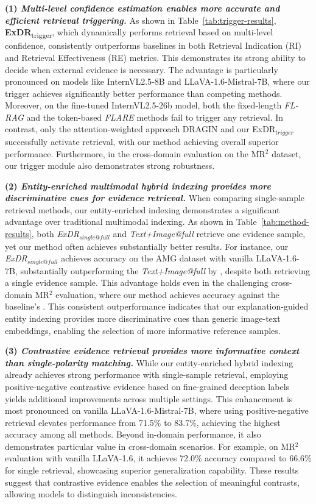 \noindent \textbf{(1) \textit{Multi-level confidence estimation enables more accurate and efficient retrieval triggering.}} 
As shown in Table~\ref{tab:trigger-results}, \textbf{ExDR}\textsubscript{trigger}, which dynamically performs retrieval based on multi-level confidence, consistently outperforms baselines in both Retrieval Indication (RI) and Retrieval Effectiveness (RE) metrics. This demonstrates its strong ability to decide when external evidence is necessary. The advantage is particularly pronounced on models like InternVL2.5-8B and LLaVA-1.6-Mistral-7B, where our trigger achieves significantly better performance than competing methods. 
Moreover,  on the fine-tuned InternVL2.5-26b model, both the fixed-length \textit{FL-RAG} and the token-based \textit{FLARE} methods fail to trigger any retrieval. In contrast, only the attention-weighted approach DRAGIN and our ExDR$_{trigger}$ successfully activate retrieval, with our method achieving overall superior performance. 
Furthermore, in the cross-domain evaluation on the MR$^2$ dataset, our trigger module also demonstrates strong robustness.

\noindent \textbf{(2) \textit{Entity-enriched multimodal hybrid indexing provides more discriminative cues for evidence retrieval.}}
When comparing single-sample retrieval methods, our entity-enriched indexing demonstrates a significant advantage over traditional multimodal indexing. As shown in Table~\ref{tab:method-results}, both \textit{ExDR$_{single@full}$} and \textit{Text+Image@full} retrieve one evidence sample, yet our method often achieves substantially better results. 
For instance, our \textit{ExDR$_{single@full}$} achieves  accuracy on the AMG dataset with vanilla LLaVA-1.6-7B, substantially outperforming the \textit{Text+Image@full} by , despite both retrieving a single evidence sample. This advantage holds even in the challenging cross-domain MR$^2$ evaluation, where our method achieves  accuracy against the baseline's . This consistent outperformance indicates that our explanation-guided entity indexing provides more discriminative cues than generic image-text embeddings, enabling the selection of more informative reference samples.

\textbf{(3) \textit{Contrastive evidence retrieval provides more informative context than single-polarity matching.}} While our entity-enriched hybrid indexing already achieves strong performance with single-sample retrieval, employing positive-negative contrastive evidence based on fine-grained deception labels yields additional improvements across multiple settings. 
This enhancement is most pronounced on vanilla LLaVA-1.6-Mistral-7B, where using positive-negative retrieval elevates performance from 71.5\% to 83.7\%, achieving the highest accuracy among all methods.  
Beyond in-domain performance, it also demonstrates particular value in cross-domain scenarios. For example, on MR$^2$ evaluation with vanilla LLaVA-1.6, it achieves 72.0\% accuracy compared to 66.6\% for single retrieval, showcasing superior generalization capability. 
These results suggest that contrastive evidence enables the selection of meaningful contrasts, allowing models to distinguish inconsistencies.

